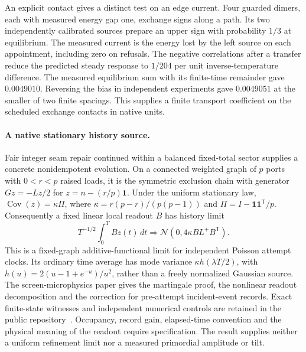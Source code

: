 \documentclass[11pt]{article}
\begin{document}
An explicit contact gives a distinct test on an edge current. Four guarded
dimers, each with measured energy gap one, exchange signs along a path.
Its two independently calibrated sources prepare an upper sign with
probability $1/3$ at equilibrium. The measured current is the energy
lost by the left source on each appointment, including zero on refusals.
The negative correlations after a transfer reduce the predicted steady
response to $1/204$ per unit inverse-temperature difference. The measured
equilibrium sum with its finite-time remainder gave $0.0049010$.
Reversing the bias in independent experiments gave $0.0049051$ at the
smaller of two finite spacings. This supplies a finite transport
coefficient on the scheduled exchange contacts in native units.





\paragraph{A native stationary history source.}
Fair integer seam repair continued within a balanced fixed-total sector
supplies a concrete nonidempotent evolution. On a connected weighted graph
of $p$ ports with $0<r<p$ raised loads, it is the symmetric exclusion chain
with generator $Gz=-Lz/2$ for $z=n-(r/p)\mathbf1$. Under the uniform
stationary law, $\operatorname{Cov}(z)=\kappa\Pi$, where
$\kappa=r(p-r)/(p(p-1))$ and $\Pi=I-\mathbf1\mathbf1^\mathsf T/p$.
Consequently a fixed linear local readout $B$ has history limit
\[
 T^{-1/2}\int_0^T Bz(t)\,dt
 \Longrightarrow \mathcal N(0,4\kappa BL^+B^\mathsf T).
\]
This is a fixed-graph additive-functional limit for independent Poisson
attempt clocks. Its ordinary time average has mode variance
$\kappa h(\lambda T/2)$, with
$h(u)=2(u-1+e^{-u})/u^2$, rather than a freely normalized Gaussian source.
The screen-microphysics paper gives the martingale proof, the nonlinear
readout decomposition and the correction for pre-attempt incident-event
records. Exact finite-state witnesses and independent numerical controls
are retained in the public repository~\cite{ophrepo}.
Occupancy, record gain, elapsed-time convention and the physical meaning of
the readout require specification. The result supplies neither a uniform
refinement limit nor a measured primordial amplitude or tilt.
\end{document}
